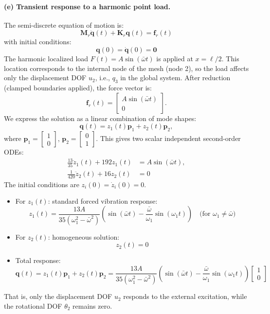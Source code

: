\documentclass[12pt]{article}
\begin{document}
\paragraph*{(e) Transient response to a harmonic point load.} The semi-discrete equation of motion is:
\[
	\mathbf{M}_r \ddot{\mathbf{q}}(t) + \mathbf{K}_r \mathbf{q}(t) = \mathbf{f}_r(t)
\]
with initial conditions:
\[
	\mathbf{q}(0) = \dot{\mathbf{q}}(0) = \mathbf{0}
\]
The harmonic localized load \( F(t) = A \sin(\bar{\omega} t) \) is applied at \( x = \ell/2 \). This location corresponds to the internal node of the mesh (node 2), so the load affects only the displacement DOF \( u_2 \), i.e., \( q_3 \) in the global system. After reduction (clamped boundaries applied), the force vector is:
\[
	\mathbf{f}_r(t) =
	\begin{bmatrix}
		A \sin(\bar{\omega} t) \\
		0
	\end{bmatrix}.
\]
We express the solution as a linear combination of mode shapes:
\[
	\mathbf{q}(t) = z_1(t) {\mathbf p}_1 + z_2(t) {\mathbf p}_2,
\]
where \( {\mathbf p}_1 = \begin{bmatrix} 1 \\ 0 \end{bmatrix} \), \( {\mathbf p}_2 = \begin{bmatrix} 0 \\ 1 \end{bmatrix} \). This gives two scalar independent second-order ODEs:
\begin{align*}
	\frac{13}{35}\ddot{z}_1(t) + 192 z_1 (t) & = A \sin(\bar{\omega} t), \\
	\frac{1}{420} \ddot{z}_2(t) + 16 z_2 (t) & = 0
\end{align*}
The initial conditions are \( z_i(0) = \dot{z}_i(0) = 0 \).
\begin{itemize}
	\item For \( z_1(t) \): standard forced vibration response:
	      \[
		      z_1(t) = \frac{13A}{35(\omega_1^2 - \bar{\omega}^2)}
		      \left( \sin(\bar{\omega} t) - \frac{\bar{\omega}}{\omega_1} \sin(\omega_1 t) \right)
		      \quad \text{(for } \omega_1 \neq \bar{\omega})
	      \]
	\item For \( z_2(t) \): homogeneous solution:
	      \[
		      z_2(t) = 0
	      \]
	\item Total response:
	      \[
		      \mathbf{q}(t) = z_1(t) {\mathbf p}_1 + z_2(t) {\mathbf p}_2
		      = \frac{13A}{35(\omega_1^2 - \bar{\omega}^2)}
		      \left( \sin(\bar{\omega} t) - \frac{\bar{\omega}}{\omega_1} \sin(\omega_1 t) \right)
		      \begin{bmatrix} 1 \\ 0 \end{bmatrix}
	      \]
\end{itemize}
That is, only the displacement DOF \( u_2 \) responds to the external excitation, while the rotational DOF \( \theta_2 \) remains zero.
\end{document}
